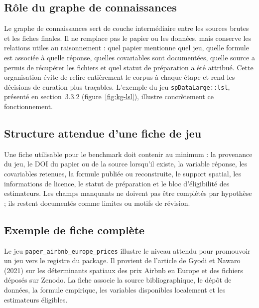 \documentclass[11pt,a4paper]{article}
\begin{document}
\subsection{Rôle du graphe de connaissances}

Le graphe de connaissances sert de couche intermédiaire entre les sources brutes et les fiches finales. Il ne remplace pas le papier ou les données, mais conserve les relations utiles au raisonnement : quel papier mentionne quel jeu, quelle formule est associée à quelle réponse, quelles covariables sont documentées, quelle source a permis de récupérer les fichiers et quel statut de préparation a été attribué. Cette organisation évite de relire entièrement le corpus à chaque étape et rend les décisions de curation plus traçables. L'exemple du jeu \texttt{spDataLarge::lsl}, présenté en section~3.3.2 (figure~\ref{fig:kg-lsl}), illustre concrètement ce fonctionnement.

\subsection{Structure attendue d'une fiche de jeu}

Une fiche utilisable pour le benchmark doit contenir au minimum : la provenance du jeu, le DOI du papier ou de la source lorsqu'il existe, la variable réponse, les covariables retenues, la formule publiée ou reconstruite, le support spatial, les informations de licence, le statut de préparation et le bloc d'éligibilité des estimateurs. Les champs manquants ne doivent pas être complétés par hypothèse ; ils restent documentés comme limites ou motifs de révision.

\subsection{Exemple de fiche complète}

Le jeu \texttt{paper\_airbnb\_europe\_prices} illustre le niveau attendu pour promouvoir un jeu vers le registre du package. Il provient de l'article de Gyodi et Nawaro (2021) sur les déterminants spatiaux des prix Airbnb en Europe et des fichiers déposés sur Zenodo. La fiche associe la source bibliographique, le dépôt de données, la formule empirique, les variables disponibles localement et les estimateurs éligibles.
\end{document}
